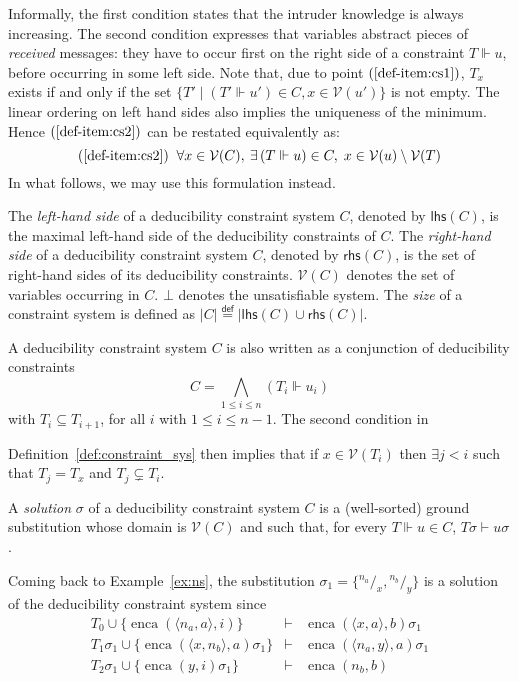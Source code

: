 \documentclass[acmtocl,acmnow]{acmtrans2m}
\newcommand{\var}{\mathcal{V}}
\newcommand{\subst}[2]{{}^{#2}\!/_{\!#1}}
\newcommand{\pair}[2]{\langle{#1},{#2}\rangle}
\newcommand{\lleft}[1]{\mathsf{lhs}(#1)}
\newcommand{\rright}[1]{\mathsf{rhs}(#1)}
\newcommand{\enca}{\operatorname{enca}}
\newcommand{\pub}[1]{#1}
\newcommand{\eqdef}{\stackrel{\mathsf{def}}{=}}
\newcommand{\dedsys}[1]{deducibility constraint system}
\newcommand{\dedconss}[1]{deducibility constraints}
\begin{document}
Informally, the first condition states that the intruder knowledge is
always increasing. The second condition expresses that variables abstract
pieces of \emph{received} messages: they have to occur first on the right
side of a constraint $T\Vdash u$, before occurring in some left side.  
Note that, due to point $(\ref{def-item:cs1})$, $T_x$ exists if and only if the set
$\{T'\mid (T'\Vdash u') \in C, x\in\var(u')\}$ is not empty. 
The linear ordering on left hand sides also implies the uniqueness of the
minimum. Hence $(\ref{def-item:cs2})$ can be restated equivalently as:
\[ (\ref{def-item:cs2}) \;\; \forall x\in \var(C), \:\exists\, (T\Vdash u)\in C, \;
x\in \var(u)\setminus\var(T) \]
In what follows, we may use this formulation instead.





The \emph{left-hand side} of a \dedsys{} $C$, denoted by $\lleft{C}$,
is the maximal left-hand side of the \dedconss{} of $C$.
The \emph{right-hand side} of a \dedsys{}
$C$, denoted by $\rright{C}$, is the set of right-hand sides of its
\dedconss{}. $\var(C)$ denotes the set of variables occurring in
$C$. $\bot$ denotes the unsatisfiable system. The \emph{size} of a
constraint system is defined as $|C|\eqdef |\lleft{C}\cup\rright{C}|$.


A \dedsys{} $C$ is also written as a conjunction of \dedconss{} $$C=\bigwedge_{1\le i\le
n}(T_i\Vdash u_i)$$ with $T_i\subseteq T_{i+1}$, for all $i$ with $1\le i\le n-1$. The second condition in

Definition~\ref{def:constraint_sys} then implies that if $x\in\var(T_i)$ then $\exists j<i$ such that $T_j=T_x$
and $T_j\subsetneq T_i$.




\begin{definition}
A \emph{solution} $\sigma$ of a \dedsys{} $C$ is a (well-sorted) ground substitution whose domain is $\var(C)$ and such that, for every $T\Vdash u\in C$, $T\sigma \vdash u\sigma$.
\end{definition}

\begin{example}
Coming back to Example~\ref{ex:ns}, the substitution 
 $\sigma_1 = \{\subst{x}{n_a},\subst{y}{n_b}\}$ is a solution of the \dedsys{} since
\[
\begin{array}{rcl}
 T_0\cup\{\enca(\pair{n_a}{a},\pub{i})\} & \vdash &
\enca(\pair{x}{a},\pub{b})\sigma_1\\
T_1\sigma_1\cup\{\enca(\pair{x}{n_b},\pub{a})\sigma_1\} & \vdash &
\enca(\pair{n_a}{y},\pub{a})\sigma_1\\
T_2\sigma_1\cup\{\enca(y,\pub{i})\sigma_1\} & \vdash &
\enca(n_b,\pub{b})
\end{array}
\]
\end{example}
\end{document}

